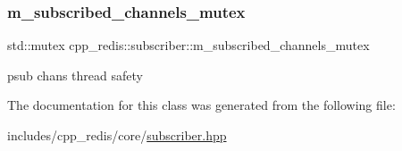 \subsubsection{\texorpdfstring{m\+\_\+subscribed\+\_\+channels\+\_\+mutex}{m\_subscribed\_channels\_mutex}}
{\footnotesize\ttfamily std\+::mutex cpp\+\_\+redis\+::subscriber\+::m\+\_\+subscribed\+\_\+channels\+\_\+mutex\hspace{0.3cm}{\ttfamily [private]}}

psub chans thread safety 

The documentation for this class was generated from the following file\+:\begin{DoxyCompactItemize}
\item 
includes/cpp\+\_\+redis/core/\hyperlink{subscriber_8hpp}{subscriber.\+hpp}\end{DoxyCompactItemize}
